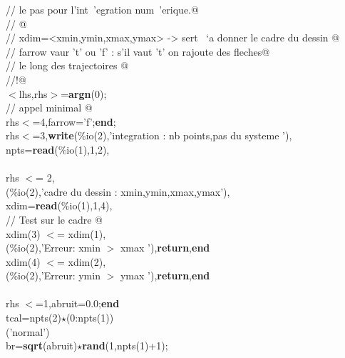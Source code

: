{\begin{flushleft}
{\cmarg \verb@//          le pas pour l'int\ 'egration num\ 'erique.@\\ 
\cmarg \verb@// @\\ 
\cmarg \verb@// xdim=<xmin,ymin,xmax,ymax> -> sert \ `a donner le cadre du dessin @\\ 
\cmarg \verb@// farrow vaur 't' ou 'f' : s'il vaut 't' on rajoute des fleches@\\ 
\cmarg \verb@//  le long des trajectoires @\\ 
\cmarg \verb@//!@\\ 
\cmarg $<$lhs,rhs$>$={\bf argn}(0);\\ 
\cmarg \verb@// appel minimal @\\ 
 rhs$<$=4,farrow='f';{\bf end};\\ 
 rhs$<$=3,{\bf write}(\%io(2),'integration : nb points,pas du systeme '),\\ 
\cmarg \hspace{0.5cm}npts={\bf read}(\%io(1),1,2),\\ 
\\ 
 rhs $<$= 2,\\ 
\cmarg \hspace{0.5cm}{\bf write}(\%io(2),'cadre du dessin : xmin,ymin,xmax,ymax'),\\ 
\cmarg \hspace{0.5cm}xdim={\bf read}(\%io(1),1,4),\\ 
\cmarg \verb@// Test sur le cadre @\\ 
\cmarg \hspace{0.5cm}{\bf if} xdim(3) $<$= xdim(1),\\ 
\cmarg \hspace{0.5cm}{\bf write}(\%io(2),'Erreur:  xmin $>$ xmax '),{\bf return},{\bf end}\\ 
\cmarg \hspace{0.5cm}{\bf if} xdim(4) $<$= xdim(2),\\ 
\cmarg \hspace{0.5cm}{\bf write}(\%io(2),'Erreur:  ymin $>$ ymax '),{\bf return},{\bf end}\\ 
 \\ 
 rhs $<$=1,abruit=0.0;{\bf end} \\ 
\cmarg tcal=npts(2)$\star$(0:npts(1))\\ 
('normal')\\ 
\cmarg br={\bf sqrt}(abruit)$\star${\bf rand}(1,npts(1)+1);\\ 
}
\end{flushleft}}
